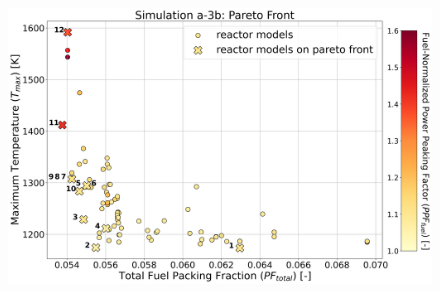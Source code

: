 \begin{frame}
\begin{columns}[t]
    \begin{column}{0.7\textwidth}
    \begin{figure}
        \includegraphics[width=\linewidth]{../docs/figures/assem-obj-3-all-2d.png} 
    \end{figure}
    \end{column}
\end{columns}
\end{frame}

